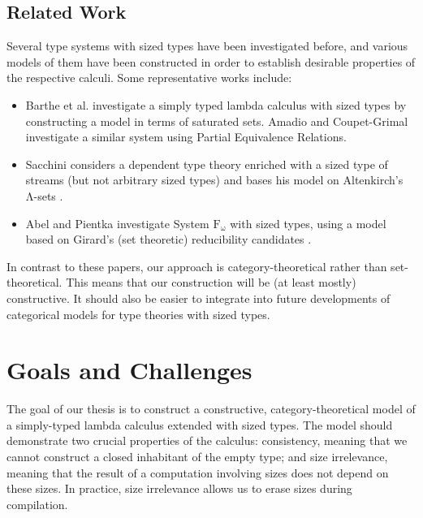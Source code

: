 \documentclass{scrartcl}
\begin{document}
\subsection{Related Work}

Several type systems with sized types have been investigated before, and various
models of them have been constructed in order to establish desirable properties
of the respective calculi. Some representative works include:
\begin{itemize}
  \item Barthe et al. \cite{barthe2004} investigate a simply typed lambda
    calculus with sized types by constructing a model in terms of saturated sets.
    Amadio and Coupet-Grimal \cite{amadio1998} investigate a similar system using
    Partial Equivalence Relations.
  \item Sacchini \cite{sacchiniphd, sacchini2013} considers a dependent type
    theory enriched with a sized type of streams (but not arbitrary sized types)
    and bases his model on Altenkirch's Λ-sets \cite{altenkirch1993}.
  \item Abel and Pientka \cite{abel2016} investigate System $\mathrm{F}_\mathrm{ω}$ with
    sized types, using a model based on Girard's (set theoretic) reducibility
    candidates \cite{girard1989}.
\end{itemize}

In contrast to these papers, our approach is category-theoretical rather than
set-theoretical. This means that our construction will be (at least mostly)
constructive. It should also be easier to integrate into future developments of
categorical models for type theories with sized types.

\section{Goals and Challenges}
\label{sec:goal}

The goal of our thesis is to construct a constructive, category-theoretical
model of a simply-typed lambda calculus extended with sized types. The model
should demonstrate two crucial properties of the calculus: consistency, meaning
that we cannot construct a closed inhabitant of the empty type; and size
irrelevance, meaning that the result of a computation involving sizes does not
depend on these sizes. In practice, size irrelevance allows us to erase sizes
during compilation.
\end{document}

